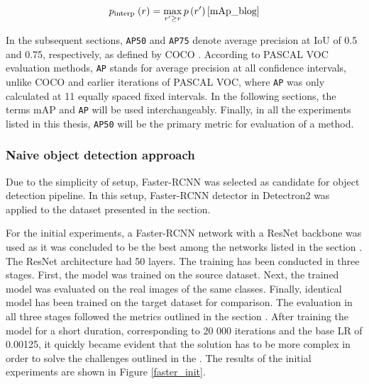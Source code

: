 \documentclass[english, 12pt, a4paper, elec, utf8, a-1b, online]{aaltothesis}
\begin{document}
\begin{equation}
p_{\text {interp }}(r)=\max _{r^{\prime} \geq r} p\left(r^{\prime}\right)
\label{interp}
\cite{mAp_blog}  
\end{equation}

In the subsequent sections, \texttt{AP50} and \texttt{AP75} denote average precision at IoU of 0.5 and 0.75, respectively, as defined by COCO \cite{Lin2014}. According to PASCAL VOC \cite{Everingham10} evaluation methods, \texttt{AP} stands for average precision at all confidence intervals, unlike COCO \cite{Lin2014} and earlier iterations of PASCAL VOC, where \texttt{AP} was only calculated at 11 equally spaced fixed intervals. In the following sections, the terms mAP and \texttt{AP} will be used interchangeably. Finally, in all the experiments listed in this thesis, \texttt{AP50} will be the primary metric for evaluation of a method.  


\subsubsection{Naive object detection approach}
\label{naive} 
Due to the simplicity of setup, Faster-RCNN \cite{ima} was selected as  candidate for object detection pipeline. In this setup, Faster-RCNN detector in Detectron2  \cite{wu2019Detectron2} was applied to the dataset presented in the  section. 

For the initial experiments, a Faster-RCNN network with a ResNet backbone was used as it was concluded to be the best among the networks listed in the section . The ResNet architecture had 50 layers. The training has been conducted in three stages. First, the model was trained on the source dataset. Next, the trained model was evaluated on the real images of the same classes. Finally, identical model has been trained on the target dataset for comparison. The evaluation in all three stages followed the metrics outlined in the section . After training the model for a short duration, corresponding to 20 000 iterations and the base LR of 0.00125, it quickly became evident that the solution has to be more complex in order to solve the challenges outlined in the . The results of the initial experiments are shown in Figure \ref{faster_init}.
\end{document}

